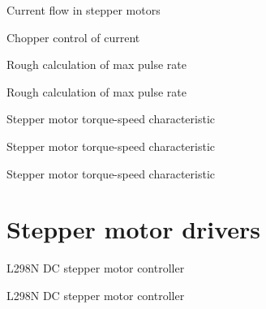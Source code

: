 \documentclass[compress]{beamer}
\begin{document}
{
    \begin{frame}{Current flow in stepper motors}
    \end{frame}
}

{
    \begin{frame}{Chopper control of current}
    \end{frame}
}

{
    \begin{frame}{Rough calculation of max pulse rate}
    \end{frame}
}

{
    \begin{frame}{Rough calculation of max pulse rate}
    \end{frame}
}

{
    \begin{frame}{Stepper motor torque-speed characteristic}
    \end{frame}
}

{
    \begin{frame}{Stepper motor torque-speed characteristic}
    \end{frame}
}

{
    \begin{frame}{Stepper motor torque-speed characteristic}
    \end{frame}
}

\section{Stepper motor drivers}

{
    \begin{frame}{L298N DC stepper motor controller}
    \end{frame}
}

{
    \begin{frame}{L298N DC stepper motor controller}
    \end{frame}
}
\end{document}
